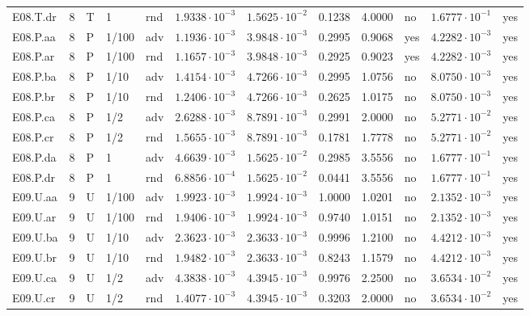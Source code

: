 {\begin{longtable}{@{}lllllllllll l@{}}
E08.T.dr & 8 & T & 1 & rnd & $1.9338\cdot 10^{-3}$ & $1.5625\cdot 10^{-2}$ & 0.1238 & 4.0000 & no & $1.6777\cdot 10^{-1}$ & yes \\
E08.P.aa & 8 & P & 1/100 & adv & $1.1936\cdot 10^{-3}$ & $3.9848\cdot 10^{-3}$ & 0.2995 & 0.9068 & yes & $4.2282\cdot 10^{-3}$ & yes \\
E08.P.ar & 8 & P & 1/100 & rnd & $1.1657\cdot 10^{-3}$ & $3.9848\cdot 10^{-3}$ & 0.2925 & 0.9023 & yes & $4.2282\cdot 10^{-3}$ & yes \\
E08.P.ba & 8 & P & 1/10 & adv & $1.4154\cdot 10^{-3}$ & $4.7266\cdot 10^{-3}$ & 0.2995 & 1.0756 & no & $8.0750\cdot 10^{-3}$ & yes \\
E08.P.br & 8 & P & 1/10 & rnd & $1.2406\cdot 10^{-3}$ & $4.7266\cdot 10^{-3}$ & 0.2625 & 1.0175 & no & $8.0750\cdot 10^{-3}$ & yes \\
E08.P.ca & 8 & P & 1/2 & adv & $2.6288\cdot 10^{-3}$ & $8.7891\cdot 10^{-3}$ & 0.2991 & 2.0000 & no & $5.2771\cdot 10^{-2}$ & yes \\
E08.P.cr & 8 & P & 1/2 & rnd & $1.5655\cdot 10^{-3}$ & $8.7891\cdot 10^{-3}$ & 0.1781 & 1.7778 & no & $5.2771\cdot 10^{-2}$ & yes \\
E08.P.da & 8 & P & 1 & adv & $4.6639\cdot 10^{-3}$ & $1.5625\cdot 10^{-2}$ & 0.2985 & 3.5556 & no & $1.6777\cdot 10^{-1}$ & yes \\
E08.P.dr & 8 & P & 1 & rnd & $6.8856\cdot 10^{-4}$ & $1.5625\cdot 10^{-2}$ & 0.0441 & 3.5556 & no & $1.6777\cdot 10^{-1}$ & yes \\
E09.U.aa & 9 & U & 1/100 & adv & $1.9923\cdot 10^{-3}$ & $1.9924\cdot 10^{-3}$ & 1.0000 & 1.0201 & no & $2.1352\cdot 10^{-3}$ & yes \\
E09.U.ar & 9 & U & 1/100 & rnd & $1.9406\cdot 10^{-3}$ & $1.9924\cdot 10^{-3}$ & 0.9740 & 1.0151 & no & $2.1352\cdot 10^{-3}$ & yes \\
E09.U.ba & 9 & U & 1/10 & adv & $2.3623\cdot 10^{-3}$ & $2.3633\cdot 10^{-3}$ & 0.9996 & 1.2100 & no & $4.4212\cdot 10^{-3}$ & yes \\
E09.U.br & 9 & U & 1/10 & rnd & $1.9482\cdot 10^{-3}$ & $2.3633\cdot 10^{-3}$ & 0.8243 & 1.1579 & no & $4.4212\cdot 10^{-3}$ & yes \\
E09.U.ca & 9 & U & 1/2 & adv & $4.3838\cdot 10^{-3}$ & $4.3945\cdot 10^{-3}$ & 0.9976 & 2.2500 & no & $3.6534\cdot 10^{-2}$ & yes \\
E09.U.cr & 9 & U & 1/2 & rnd & $1.4077\cdot 10^{-3}$ & $4.3945\cdot 10^{-3}$ & 0.3203 & 2.0000 & no & $3.6534\cdot 10^{-2}$ & yes \\

\end{longtable}}
